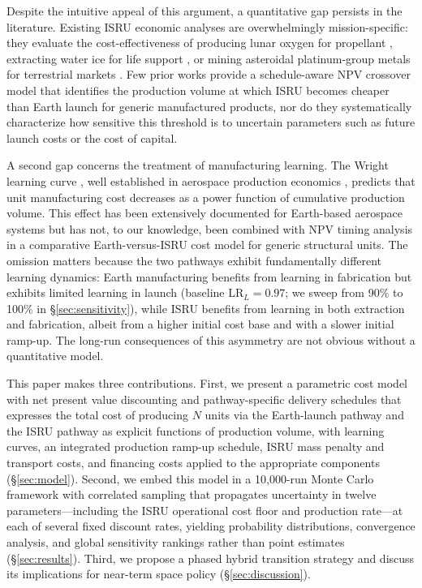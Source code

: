 \documentclass[preprint,12pt]{elsarticle}
\begin{document}
Despite the intuitive appeal of this argument, a quantitative gap persists in the literature. Existing ISRU economic analyses are overwhelmingly mission-specific: they evaluate the cost-effectiveness of producing lunar oxygen for propellant \cite{sanders2015}, extracting water ice for life support \cite{zubrin1996}, or mining asteroidal platinum-group metals for terrestrial markets \cite{sonter1997,elvis2012}. Few prior works provide a schedule-aware NPV crossover model that identifies the production volume at which ISRU becomes cheaper than Earth launch for generic manufactured products, nor do they systematically characterize how sensitive this threshold is to uncertain parameters such as future launch costs or the cost of capital.

A second gap concerns the treatment of manufacturing learning. The Wright learning curve \cite{wright1936}, well established in aerospace production economics \cite{wertz2011}, predicts that unit manufacturing cost decreases as a power function of cumulative production volume. This effect has been extensively documented for Earth-based aerospace systems \cite{argote1990,nagy2013} but has not, to our knowledge, been combined with NPV timing analysis in a comparative Earth-versus-ISRU cost model for generic structural units. The omission matters because the two pathways exhibit fundamentally different learning dynamics: Earth manufacturing benefits from learning in fabrication but exhibits limited learning in launch (baseline $\mathrm{LR}_L = 0.97$; we sweep from 90\% to 100\% in \S\ref{sec:sensitivity}), while ISRU benefits from learning in both extraction and fabrication, albeit from a higher initial cost base and with a slower initial ramp-up. The long-run consequences of this asymmetry are not obvious without a quantitative model.

This paper makes three contributions. First, we present a parametric cost model with net present value discounting and pathway-specific delivery schedules that expresses the total cost of producing $N$ units via the Earth-launch pathway and the ISRU pathway as explicit functions of production volume, with learning curves, an integrated production ramp-up schedule, ISRU mass penalty and transport costs, and financing costs applied to the appropriate components (\S\ref{sec:model}). Second, we embed this model in a 10{,}000-run Monte Carlo framework with correlated sampling that propagates uncertainty in twelve parameters---including the ISRU operational cost floor and production rate---at each of several fixed discount rates, yielding probability distributions, convergence analysis, and global sensitivity rankings rather than point estimates (\S\ref{sec:results}). Third, we propose a phased hybrid transition strategy and discuss its implications for near-term space policy (\S\ref{sec:discussion}).
\end{document}
